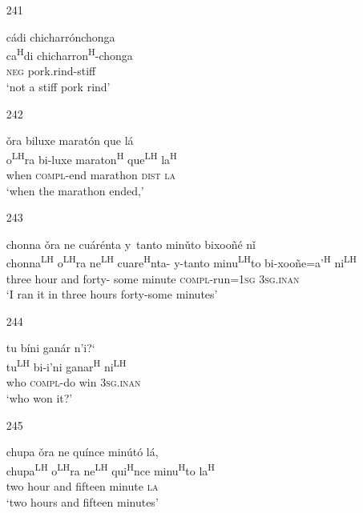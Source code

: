 \begin{itemize}
\item[241]
 
\glll   c\'{a}di chicharr\'{o}nchonga\\
 ca\textsuperscript{H}di chicharron\textsuperscript{H}-chonga\\
\textsc{neg} pork.rind-stiff\\
\glt `not a stiff pork rind'
 


\item[242]
 
\glll   \v{o}ra biluxe marat\'{o}n que l\'{a}\\
 o\textsuperscript{LH}ra bi-luxe maraton\textsuperscript{H} que\textsuperscript{LH} la\textsuperscript{H}\\
 when \textsc{compl}-end marathon \textsc{dist} \textsc{la}\\
\glt `when the marathon ended,'
 


\item[243]
 
\glll chonna \v{o}ra ne cu\'{a}r\'{e}nta y~tanto min\v{u}to bixoo\~{n}\'{e} n\v{i}\\
      chonna\textsuperscript{LH} o\textsuperscript{LH}ra ne\textsuperscript{LH} cuare\textsuperscript{H}nta- y-tanto minu\textsuperscript{LH}to bi-xoo\~{n}e=a'\textsuperscript{H} ni\textsuperscript{LH}\\ 
three hour and forty- some minute \textsc{compl}-run=\textsc{1sg} \textsc{3sg.inan}\\
\glt `I ran it in three hours forty-some minutes'
 


\item[244]
 
tu b\'{i}ni gan\'{a}r n'{i}{?`}\\
tu\textsuperscript{LH} bi-i'ni ganar\textsuperscript{H} ni\textsuperscript{LH}\\
who \textsc{compl}-do win \textsc{3sg.inan}\\
\glt `who won it?'
 

\item[245]
 
\glll   chupa \v{o}ra ne qu\'{i}nce min\'{u}t\'{o} l\'{a},\\
 chupa\textsuperscript{LH} o\textsuperscript{LH}ra ne\textsuperscript{LH} qui\textsuperscript{H}nce minu\textsuperscript{H}to la\textsuperscript{H}\\
 two hour and fifteen minute \textsc{la}\\
\glt `two hours and fifteen minutes'
 



\end{itemize}
